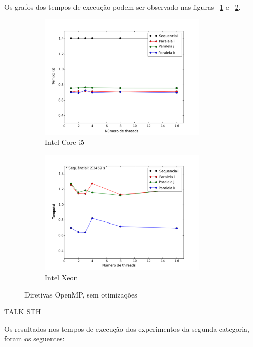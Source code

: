 \documentclass[a4paper,12pt,fleqn]{article}
\begin{document}
Os grafos dos tempos de execução podem ser observado nas figuras ~\ref{fig:corei5so} e ~\ref{fig:xeonso}.
 
\begin{figure}[htb] 
    \centering
    \begin{subfigure}{.5\textwidth}
        \centering
        \includegraphics[height=6cm]{Images/corei5so} 
        \caption{Intel Core i5}
        \label{fig:corei5so} 
    \end{subfigure}%
    \begin{subfigure}{.5\textwidth}
        \centering
        \includegraphics[height=6cm]{Images/xeonso} 
        \caption{Intel Xeon}
        \label{fig:xeonso} 
    \end{subfigure}
    \caption{Diretivas OpenMP, sem otimizações}
    \label{fig:so}
\end{figure} 


TALK STH

Os resultados nos tempos de execução dos experimentos da segunda categoria, foram os seguentes:
\end{document}
